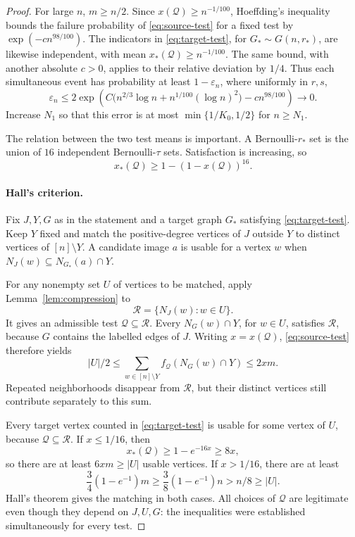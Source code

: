 \documentclass[11pt]{article}
\theoremstyle{remark}
\numberwithin{equation}{section}
\newcommand{\calQ}{\mathcal Q}
\newcommand{\calR}{\mathcal R}
\begin{document}
\begin{proof}
For large $n$, $m\geq n/2$. Since $x(\calQ)\geq n^{-1/100}$,
Hoeffding's inequality \cite{Hoeffding63} bounds the failure
probability of \eqref{eq:source-test} for a fixed test by
$\exp(-c n^{98/100})$. The indicators in
\eqref{eq:target-test}, for $G_*\sim G(n,r_*)$, are likewise
independent, with mean $x_*(\calQ)\geq n^{-1/100}$.
The same bound, with another absolute $c>0$, applies to their
relative deviation by $1/4$.
Thus each simultaneous event has probability at least
$1-\varepsilon_n$, where uniformly in $r,s$,
\begin{equation}\label{eq:uniform-error}
 \varepsilon_n\leq
 2\exp\!\left(
 C\bigl(n^{2/3}\log n+n^{1/100}(\log n)^2\bigr)
 -c n^{98/100}\right)\longrightarrow0.
\end{equation}
Increase $N_1$ so that this error is at most
$\min\{1/K_0,1/2\}$ for $n\geq N_1$.

The relation between the two test means is important. A
Bernoulli-$r_*$ set is the union of $16$ independent
Bernoulli-$\tau$ sets. Satisfaction is increasing, so
\begin{equation}\label{eq:amplification}
 x_*(\calQ)\geq1-(1-x(\calQ))^{16}.
\end{equation}

\paragraph{Hall's criterion.}
Fix $J,Y,G$ as in the statement and a target graph $G_*$
satisfying \eqref{eq:target-test}. Keep $Y$ fixed and match
the positive-degree vertices of $J$ outside $Y$ to distinct
vertices of $[n]\setminus Y$. A candidate image $a$ is usable
for a vertex $w$ when
$N_J(w)\subseteq N_{G_*}(a)\cap Y$.

For any nonempty set $U$ of vertices to be matched, apply
Lemma~\ref{lem:compression} to
\[
 \calR=\{N_J(w):w\in U\}.
\]
It gives an admissible test $\calQ\subseteq\calR$.
Every $N_G(w)\cap Y$, for $w\in U$, satisfies $\calR$,
because $G$ contains the labelled edges of $J$. Writing
$x=x(\calQ)$, \eqref{eq:source-test} therefore yields
\begin{equation}\label{eq:hall-source}
 |U|/2\leq\sum_{w\in[n]\setminus Y}
       f_{\calQ}(N_G(w)\cap Y)\leq2xm.
\end{equation}
Repeated neighborhoods disappear from $\calR$, but their
distinct vertices still contribute separately to this sum.

Every target vertex counted in \eqref{eq:target-test} is usable
for some vertex of $U$, because $\calQ\subseteq\calR$.
If $x\leq1/16$, then
\[
 x_*(\calQ)\geq1-e^{-16x}\geq8x,
\]
so there are at least $6xm\geq|U|$ usable vertices.
If $x>1/16$, there are at least
\[
 \frac34(1-e^{-1})m\geq\frac38(1-e^{-1})n>n/8\geq|U|.
\]
Hall's theorem \cite{Hall35} gives the matching in both cases.
All choices of $\calQ$ are legitimate even though they depend
on $J,U,G$: the inequalities were established simultaneously
for every test.


\end{proof}
\end{document}
